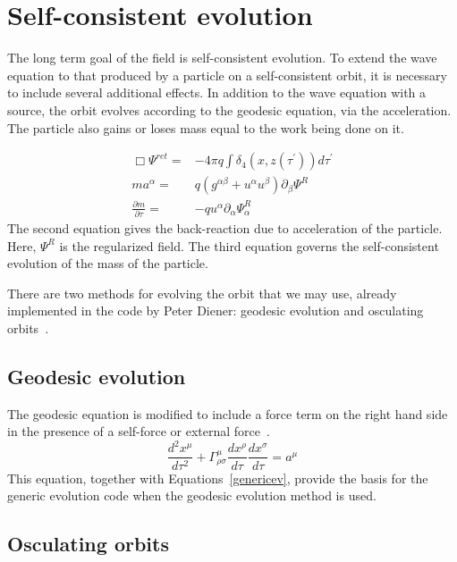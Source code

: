\section{Self-consistent evolution}



The long term goal of the field is self-consistent evolution. To extend the wave equation to that produced by a particle on a self-consistent orbit, it is necessary to include several additional effects. In addition to the wave equation with a source, the orbit evolves according to the geodesic equation, via the acceleration. The particle also gains or loses mass equal to the work being done on it. 

\begin{eqnarray}
  \Box\Psi^{ret} =& -4\pi q \int\delta_4(x,z(\tau^\prime))d\tau^\prime\nonumber\\
    ma^\alpha=&q(g^{\alpha\beta}+u^\alpha u^\beta)\partial_\beta\Psi^{R}\nonumber\\
    \frac{\partial m}{\partial \tau}=&-q u^\alpha\partial_\alpha \Psi^R_\alpha
    \label{genericev}
\end{eqnarray}
The second equation gives the back-reaction due to acceleration of the particle. Here, $\Psi^R$ is the regularized field. The third equation governs the self-consistent evolution of the mass of the particle.~\cite{WardellSelfForceReview}

There are two methods for evolving the orbit that we may use, already implemented in the code by Peter Diener: geodesic evolution and osculating orbits~\cite{pound_poisson}.

\subsection{Geodesic evolution}
The geodesic equation is modified to include a force term on the right hand side in the presence of a self-force or external force~\cite{Carroll}.
\begin{equation}
  \frac{d^2x^\mu}{d\tau^2}+\Gamma^\mu_{\rho\sigma}\frac{dx^\rho}{d\tau}\frac{dx^\sigma}{d\tau}=a^\mu
\end{equation}
This equation, together with Equations~\ref{genericev}, provide the basis for the generic evolution code when the geodesic evolution method is used. 

\subsection{Osculating orbits}

